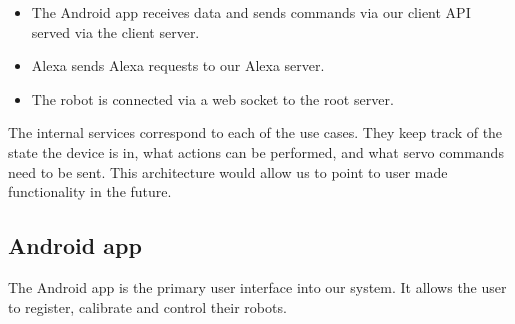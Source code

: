 \documentclass[onecolumn]{IEEEtran}
\begin{document}
\begin{itemize}
    \item The Android app receives data and sends commands via our client API served via the client server. 
    \item Alexa sends Alexa requests to our Alexa server.
    \item The robot is connected via a web socket to the root server.
\end{itemize}

The internal services correspond to each of the use cases. They keep track of the state the device is in, what actions can be performed, and what servo commands need to be sent. This architecture would allow us to point to user made functionality in the future.

\subsection{Android app}

The Android app is the primary user interface into our system. It allows the user to register, calibrate and control their robots.
\end{document}
